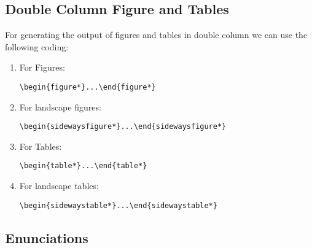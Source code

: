 \documentclass{juliacon}
\begin{document}
\subsection{Double Column Figure and Tables}
\label{subsub:double_fig_tab}
For generating the output of figures and tables in double column
we can use the following coding:

\begin{enumerate}
\item For Figures:
\begin{verbatim}
\begin{figure*}...\end{figure*}
\end{verbatim}
\item For landscape figures:
\begin{verbatim}
\begin{sidewaysfigure*}...\end{sidewaysfigure*}
\end{verbatim}
\item For Tables:
\begin{verbatim}
\begin{table*}...\end{table*}
\end{verbatim}
\item For landscape tables:
\begin{verbatim}
\begin{sidewaystable*}...\end{sidewaystable*}
\end{verbatim}
\end{enumerate}

\subsection{Enunciations}
\label{subsub:enunciation}
\end{document}
